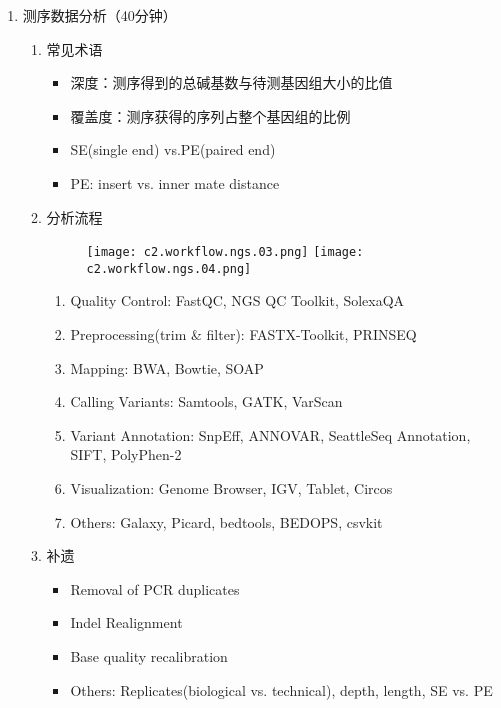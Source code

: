 \documentclass{TIJMUjiaoanLL}
\begin{document}
\begin{enumerate}
  \item 测序数据分析（40分钟）
    \begin{enumerate}
      \item 常见术语
        \begin{itemize}
          \item 深度：测序得到的总碱基数与待测基因组大小的比值
          \item 覆盖度：测序获得的序列占整个基因组的比例
          \item SE(single end) vs.PE(paired end)
          \item PE: insert vs. inner mate distance
        \end{itemize}
      \item 分析流程
            \vspace{-0.5em}
            \begin{figure}[h]
              \centering
              \texttt{[image: c2.workflow.ngs.03.png]}
              \quad
              \texttt{[image: c2.workflow.ngs.04.png]}
            \end{figure}
            \vspace{-0.5em}
            \begin{enumerate}
              \item Quality Control: FastQC, NGS QC Toolkit, SolexaQA
              \item Preprocessing(trim \& filter): FASTX-Toolkit, PRINSEQ
              \item Mapping: BWA, Bowtie, SOAP
              \item Calling Variants: Samtools, GATK, VarScan
              \item Variant Annotation: SnpEff, ANNOVAR, SeattleSeq Annotation, SIFT, PolyPhen-2
              \item Visualization: Genome Browser, IGV, Tablet, Circos
              \item Others: Galaxy, Picard, bedtools, BEDOPS, csvkit
            \end{enumerate}
      \item 补遗
        \begin{itemize}
          \item Removal of PCR duplicates
          \item Indel Realignment
          \item Base quality recalibration
          \item Others: Replicates(biological vs. technical), depth, length, SE vs. PE
        \end{itemize}
    \end{enumerate}


\end{enumerate}
\end{document}
